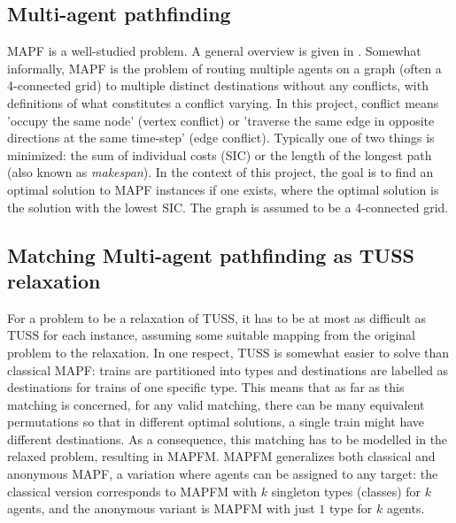 \documentclass[a4paper,10pt,english]{article}
\begin{document}
	\subsection*{Multi-agent pathfinding} MAPF is a well-studied problem. A general overview is given in \cite{stern2019}. Somewhat informally, MAPF is the problem of routing multiple agents on a graph (often a 4-connected grid) to multiple distinct destinations without any conflicts, with definitions of what constitutes a conflict varying. In this project, conflict means 'occupy the same node' (vertex conflict) or 'traverse the same edge in opposite directions at the same time-step' (edge conflict). Typically one of two things is minimized: the sum of individual costs (SIC) or the length of the longest path (also known as \textit{makespan}). In the context of this project, the goal is to find an optimal solution to MAPF instances if one exists, where the optimal solution is the solution with the lowest SIC. The graph is assumed to be a 4-connected grid.
	
	\subsection*{Matching Multi-agent pathfinding as TUSS relaxation}
	For a problem to be a relaxation of TUSS, it has to be at most as difficult as TUSS for each instance, assuming some suitable mapping from the original problem to the relaxation. In one respect, TUSS is somewhat easier to solve than classical MAPF: trains are partitioned into types and destinations are labelled as destinations for trains of one specific type. This means that as far as this matching is concerned, for any valid matching, there can be many equivalent permutations so that in different optimal solutions, a single train might have different destinations. As a consequence, this matching has to be modelled in the relaxed problem, resulting in MAPFM. MAPFM generalizes both classical and anonymous MAPF, a variation where agents can be assigned to any target: the classical version corresponds to MAPFM with $k$ singleton types (classes) for $k$ agents, and the anonymous variant is MAPFM with just $1$ type for $k$ agents\cite{ma2016}.
	
\end{document}
